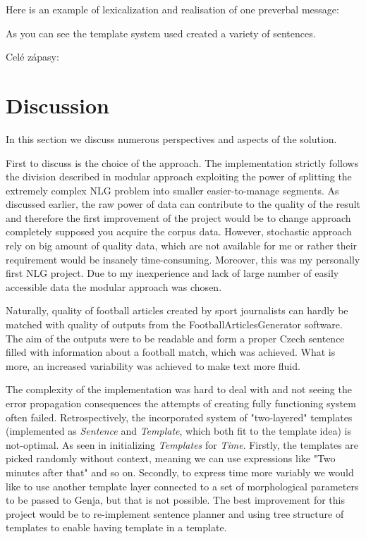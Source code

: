 Here is an example of lexicalization and realisation of one preverbal message:


As you can see the template system used created a variety of sentences.


Celé zápasy:

\section{Discussion}
In this section we discuss numerous perspectives and aspects of the solution.

First to discuss is the choice of the approach. The implementation strictly follows the division described in modular approach exploiting the power of splitting the extremely complex NLG problem into smaller easier-to-manage segments. As discussed earlier, the raw power of data can contribute to the quality of the result and therefore the first improvement of the project would be to change approach completely supposed you acquire the corpus data. However, stochastic approach rely on big amount of quality data, which are not available for me or rather their requirement would be insanely time-consuming. Moreover, this was my personally first NLG project. Due to my inexperience and lack of large number of easily accessible data the modular approach was chosen.

Naturally, quality of football articles created by sport journalists can hardly be matched with quality of outputs from the FootballArticlesGenerator software. The aim of the outputs were to be readable and form a proper Czech sentence filled with information about a football match, which was achieved. What is more, an increased variability was achieved to make text more fluid.

The complexity of the implementation was hard to deal with and not seeing the error propagation consequences the attempts of creating fully functioning system often failed. Retrospectively, the incorporated system of "two-layered" templates (implemented as \textit{Sentence} and \textit{Template}, which both fit to the template idea) is not-optimal. As seen in initializing \textit{Templates} for \textit{Time}. Firstly, the templates are picked randomly without context, meaning we can use expressions like "Two minutes after that" and so on. Secondly, to express time more variably we would like to use another template layer connected to a set of morphological parameters to be passed to Genja, but that is not possible. The best improvement for this project would be to re-implement sentence planner and using tree structure of templates to enable having template in a template. 

